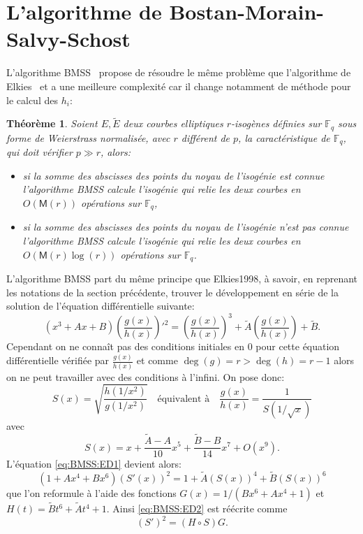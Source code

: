 \documentclass[10pt,a4paper]{book}
\theoremstyle{plain}
\newtheorem{thm}{Théorème}[chapter]
\theoremstyle{definition}
\theoremstyle{definition}
\theoremstyle{definition}
\theoremstyle{definition}
\theoremstyle{definition}
\theoremstyle{remark}
\theoremstyle{remark}
\theoremstyle{definition}
\begin{document}
\section{L'algorithme de Bostan-Morain-Salvy-Schost}
L'algorithme BMSS~\cite{BMSS08} propose de résoudre le même problème que 
l'algorithme de Elkies~\cite{Elkies1998} et a une meilleure complexité car 
il change notamment de méthode pour le calcul des $h_i$:
\begin{thm}
\label{thm:BMSS}
Soient $E, \tilde{E}$ deux courbes elliptiques $r$-isogènes définies sur 
$\mathbb{F}_q$ sous forme de Weierstrass normalisée, avec $r$ différent de 
$p$, la caractéristique de $\mathbb{F}_q$, qui doit vérifier 
$p \gg r$, alors:
\begin{itemize}
\item  si la somme des abscisses des points du noyau de l'isogénie est connue 
l'algorithme BMSS  calcule l'isogénie qui relie les deux courbes en 
$O(\mathsf{M}(r))$ opérations sur $\mathbb{F}_q$,
\item si la somme des abscisses des points du noyau de l'isogénie n'est pas 
connue l'algorithme BMSS calcule l'isogénie qui relie les 
deux courbes en $O(\mathsf{M}(r)\log(r))$ opérations sur $\mathbb{F}_q$.
\end{itemize}
\end{thm}

L'algorithme BMSS part du même principe que Elkies1998, à savoir, en reprenant 
les notations de la section précédente, trouver le développement en série de la
solution de l'équation différentielle suivante:   
\begin{equation}
\label{eq:BMSS:ED1}
(x^3+Ax+B)\left(\frac{g(x)}{h(x)} \right)'^2=  \left(\frac{g(x)}{h(x)} \right)^3 + \tilde{A} \left(\frac{g(x)}{h(x)} \right) + \tilde{B}.
\end{equation}
Cependant on ne connaît pas des conditions initiales en $0$ pour cette équation
différentielle vérifiée par $\frac{g(x)}{h(x)}$ et comme $\deg(g)=r> \deg(h)= 
r-1$ alors on ne peut travailler avec des conditions à l'infini. On pose donc:
\begin{equation}
S(x)=\sqrt{\frac{h(1/x^2)}{g(1/x^2)}} \quad \text{équivalent à} \quad \frac{g(x)}{h(x)}=\frac{1}{S(1/\sqrt{x})}
\end{equation} 
avec 
\begin{equation}
S(x)=x + \frac{\tilde{A}-A}{10}x^5+\frac{\tilde{B}-B}{14}x^7+O(x^9).
\end{equation}
L'équation \eqref{eq:BMSS:ED1} devient alors:
\begin{equation}
\label{eq:BMSS:ED2}
(1+Ax^4+Bx^6)(S'(x))^2=1+\tilde{A}(S(x))^4+\tilde{B}(S(x))^6
\end{equation}
que l'on reformule à l'aide des fonctions $G(x)=1/(Bx^6+Ax^4+1)$ et $H(t)=\tilde{B}t^6+\tilde{A}t^4+1$. Ainsi \eqref{eq:BMSS:ED2} est réécrite comme 
\begin{equation}
\label{eq:BMSS:ED3}
(S')^2=(H \circ S) G.
\end{equation}
\end{document}
